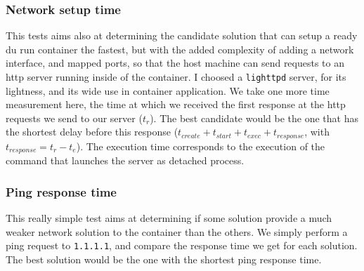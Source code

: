 \subsubsection{Network setup time}
This tests aims also at determining the candidate solution that can setup a ready du run container the fastest, but with the added complexity of adding a network interface, and mapped ports, so that the host machine can send requests to an http server running inside of the container.  I choosed a \texttt{lighttpd} server, for its lightness, and its wide use in container application.  We take one more time measurement here, the time at which we received the first response at the http requests we send to our server ($t_r$).  The best candidate would be the one that has the shortest delay before this response ($t_{create} + t_{start} + t_{exec} + t_{response}$, with $t_{response}=t_r - t_e$).  The execution time corresponds to the execution of the command that launches the server as detached process.

\subsubsection{Ping response time}
This really simple test aims at determining if some solution provide a much weaker network solution to the container than the others.  We simply perform a ping request to \texttt{1.1.1.1}, and compare the response time we get for each solution.  The best solution would be the one with the shortest ping response time.
